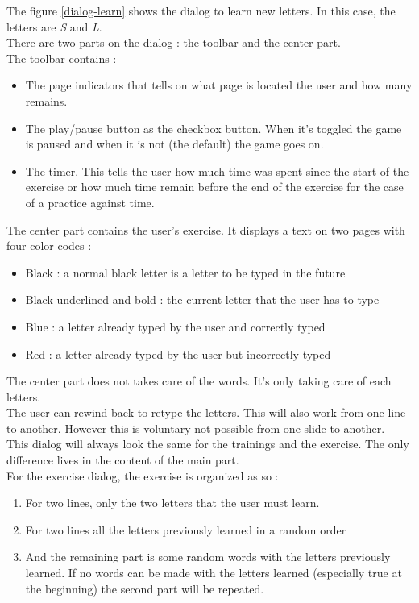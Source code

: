 The figure \ref{dialog-learn} shows the dialog to learn new letters. In this case, the letters are \textit{S} and \textit{L}.\\
There are two parts on the dialog : the toolbar and the center part.\\
The toolbar contains :
\begin{itemize}
	\item The page indicators that tells on what page is located the user and how many remains.
	\item The play/pause button as the checkbox button. When it's toggled the game is paused and when it is not (the default) the game goes on.
	\item The timer. This tells the user how much time was spent since the start of the exercise or how much time remain before the end of the exercise for the case of a practice against time.
\end{itemize}

The center part contains the user's exercise. It displays a text on two pages with four color codes :
\begin{itemize}
	\item Black : a normal black letter is a letter to be typed in the future
	\item Black underlined and bold : the current letter that the user has to type
	\item Blue : a letter already typed by the user and correctly typed
	\item Red  : a letter already typed by the user but incorrectly typed
\end{itemize}

The center part does not takes care of the words. It's only taking care of each letters.\\
The user can rewind back to retype the letters. This will also work from one line to another. However this is voluntary not possible
from one slide to another.\\
This dialog will always look the same for the trainings and the exercise. The only difference lives in the content of the main part.\\
For the exercise dialog, the exercise is organized as so :
\begin{enumerate}
	\item For two lines, only the two letters that the user must learn.
	\item For two lines all the letters previously learned in a random order
	\item And the remaining part is some random words with the letters previously learned. If no words can be made with the letters learned (especially true at the beginning) the second part will be repeated.
\end{enumerate}

